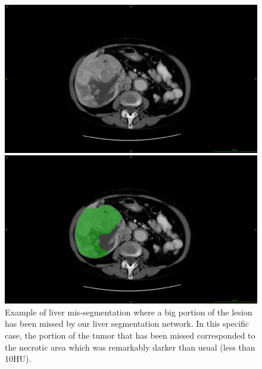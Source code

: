 \begin{figure}[ht!]
	\centering
	\begin{minipage}{0.45\linewidth}
		\includegraphics[width=\linewidth]{../Contributions/images/MisSegmentations/ResizeTCGA-DD-A1EB_slice16_raw}
	\end{minipage} \hspace{-0.1cm}
	\begin{minipage}{0.45\linewidth}
		\includegraphics[width=\linewidth]{../Contributions/images/MisSegmentations/ResizeTCGA-DD-A1EB_slice16_liverPrediction_Cmap}
	\end{minipage}
	\caption{Example of liver mis-segmentation where a big portion of the lesion has been missed by our liver segmentation network. In this specific case, the portion of the tumor that has been missed corresponded to the necrotic area which was remarkably darker than usual (less than 10HU).}
	\label{fig:LITS_networkMisSeg_tumor}
\end{figure}

